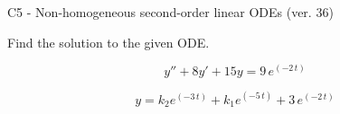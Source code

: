 \begin{exercise}
  \begin{exerciseTitle}C5 - Non-homogeneous second-order linear ODEs (ver. 36)\end{exerciseTitle}
  \begin{exerciseStatement}
    
Find the solution to the given ODE.

    
\[y''+8y'+15y = 9 \, e^{\left(-2 \, t\right)}\]

  \end{exerciseStatement}
  \begin{exerciseAnswer}
    
\[y= k_{2} e^{\left(-3 \, t\right)} + k_{1} e^{\left(-5 \, t\right)} + 3 \, e^{\left(-2 \, t\right)}\]

  \end{exerciseAnswer}
\end{exercise}